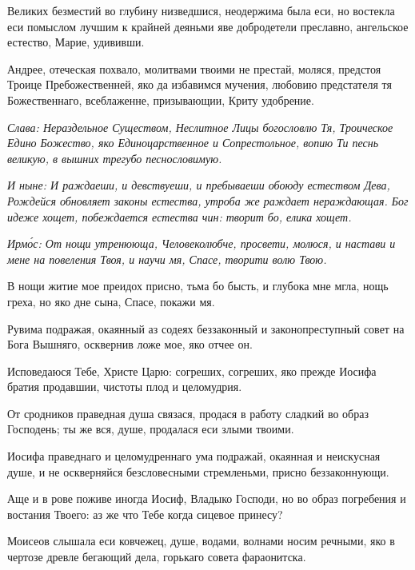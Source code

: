 
Великих безместий во глубину низведшися, неодержима была еси, но востекла еси помыслом лучшим к крайней деяньми яве добродетели преславно, ангельское естество, Марие, удививши.


Андрее, отеческая похвало, молитвами твоими не престай, моляся, предстоя Троице Пребожественней, яко да избавимся мучения, любовию предстателя тя Божественнаго, всеблаженне, призывающии, Криту удобрение.

\itshape Слава\normalfont{}: Нераздельное Существом, Неслитное Лицы богословлю Тя, Троическое Едино Божество, яко Единоцарственное и Сопрестольное, вопию Ти песнь великую, в вышних трегубо песнословимую.

\itshape И ныне\normalfont{}: И раждаеши, и девствуеши, и пребываеши обоюду естеством Дева, Рождейся обновляет законы естества, утроба же раждает нераждающая. Бог идеже хощет, побеждается естества чин: творит бо, елика хощет. 


\itshape Ирм\'{о}с\normalfont{}: От нощи утренююща, Человеколюбче, просвети, молюся, и настави и мене на повеления Твоя, и научи мя, Спасе, творити волю Твою.

В нощи житие мое преидох присно, тьма бо бысть, и глубока мне мгла, нощь греха, но яко дне сына, Спасе, покажи мя.

Рувима подражая, окаянный аз содеях беззаконный и законопреступный совет на Бога Вышняго, осквернив ложе мое, яко отчее он.

Исповедаюся Тебе, Христе Царю: согреших, согреших, яко прежде Иосифа братия продавшии, чистоты плод и целомудрия.

От сродников праведная душа связася, продася в работу сладкий во образ Господень; ты же вся, душе, продалася еси злыми твоими.

Иосифа праведнаго и целомудреннаго ума подражай, окаянная и неискусная душе, и не оскверняйся безсловесными стремленьми, присно беззаконнующи.

Аще и в рове поживе иногда Иосиф, Владыко Господи, но во образ погребения и востания Твоего: аз же что Тебе когда сицевое принесу?

Моисеов слышала еси ковчежец, душе, водами, волнами носим речными, яко в чертозе древле бегающий дела, горькаго совета фараонитска.

